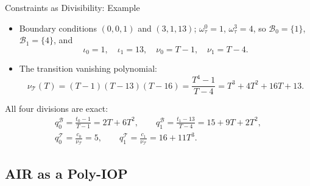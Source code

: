 \documentclass{zkdl-presentation-template}
\begin{document}
    \begin{frame}{Constraints as Divisibility: Example}
        \begin{itemize}
            \item Boundary conditions $(0, 0, 1)$ and $(3, 1, 13)$; $\omega_\tau^0 = 1$, $\omega_\tau^3 = 4$, so $\mathcal{B}_0 = \{1\}$, $\mathcal{B}_1 = \{4\}$, and
            \begin{equation*}
                \iota_0 = 1, \quad \iota_1 = 13, \quad \nu_0 = T - 1, \quad \nu_1 = T - 4.
            \end{equation*}
            \pause
            \vspace{-10pt}
            \item The transition vanishing polynomial:
            \begin{equation*}
                \nu_{\mathcal{T}}(T) = (T - 1)(T - 13)(T - 16) = \frac{T^4 - 1}{T - 4} = T^3 + 4T^2 + 16T + 13.
            \end{equation*}
        \end{itemize}
        \pause
        All four divisions are exact:
        \begin{gather*}
            q^{\mathcal{B}}_0 = \frac{t_0 - 1}{T - 1} = 2T + 6T^2, \qquad
            q^{\mathcal{B}}_1 = \frac{t_1 - 13}{T - 4} = 15 + 9T + 2T^2, \\
            q^{\mathcal{T}}_0 = \frac{c_0}{\nu_{\mathcal{T}}} = 5, \qquad
            q^{\mathcal{T}}_1 = \frac{c_1}{\nu_{\mathcal{T}}} = 16 + 11T^3.
        \end{gather*}
    \end{frame}

    \subsection{AIR as a Poly-IOP}
\end{document}
